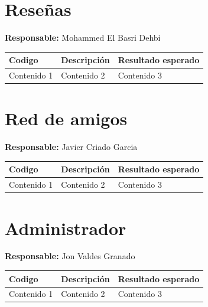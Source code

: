 ﻿\documentclass{report}
\begin{document}
        \section{Reseñas}
            \begin{center}
                \textbf{Responsable:} Mohammed El Basri Dehbi\\
                \begin{longtable}{|m{2cm}|m{4cm}|m{4cm}|}
                    \hline
                    Codigo & Descripción & Resultado esperado \\
                    \hline
                    \endhead
                    Contenido 1 & Contenido 2 & Contenido 3 \\
                    \hline
                \end{longtable}
            \end{center}
            \clearpage
        \section{Red de amigos} 
            \begin{center}
                \textbf{Responsable:} Javier Criado Garcia\\
                \begin{longtable}{|m{2cm}|m{4cm}|m{4cm}|}
                    \hline
                    Codigo & Descripción & Resultado esperado \\
                    \hline
                    \endhead 
                    \hline
                    Contenido 1 & Contenido 2 & Contenido 3 \\
                    \hline
                \end{longtable}
            \end{center}
            \clearpage
        \section{Administrador}
            \begin{center}
                \textbf{Responsable:} Jon Valdes Granado\\
                \begin{longtable}{|m{2cm}|m{4cm}|m{4cm}|}
                    \hline
                    Codigo & Descripción & Resultado esperado \\
                    \hline
                    \endhead
                    \hline
                    Contenido 1 & Contenido 2 & Contenido 3 \\
                    \hline
                \end{longtable}
            \end{center}
            \clearpage
\end{document}
